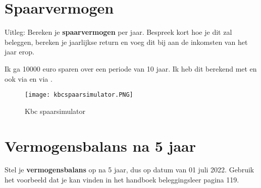 \endgroup






\section{Spaarvermogen}

Uitleg: Bereken je \textbf{spaarvermogen} per jaar. Bespreek kort hoe je dit zal beleggen, bereken je jaarlijkse return en voeg dit bij aan de inkomsten van het jaar erop.\newline\newline

Ik ga 10000 euro sparen over een periode van 10 jaar. Ik heb dit berekend met  en ook via  en via .

\begin{figure}[!htbp]
	\centering
	\texttt{[image: kbcspaarsimulator.PNG]}
	\caption{Kbc spaarsimulator}
	\label{fig:Kbc spaarsimulator}
\end{figure}


\setlrmarginsandblock{3.5cm}{3.5cm}{*}
\checkandfixthelayout

\section{Vermogensbalans na 5 jaar}

Stel je \textbf{vermogensbalans} op na 5 jaar, dus op datum van 01 juli 2022. Gebruik het voorbeeld dat je kan vinden in het handboek beleggingsleer pagina 119.

\begingroup

\renewcommand{\arraystretch}{1.5}

